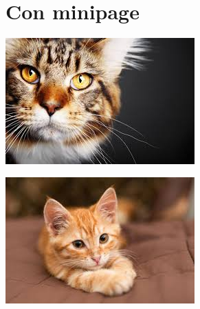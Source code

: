 \documentclass{article}
\begin{document}
\section{Con minipage}
\begin{minipage}[t]{.5\linewidth}
	\centering
	\includegraphics[width = .9\linewidth]{cat1}\label{img:cat1}
\end{minipage}
\hfill
\begin{minipage}[t]{.5\linewidth}
	\centering
	\includegraphics[width = .9\linewidth]{cat2}\label{img:cat2}
\end{minipage}
\end{document}
